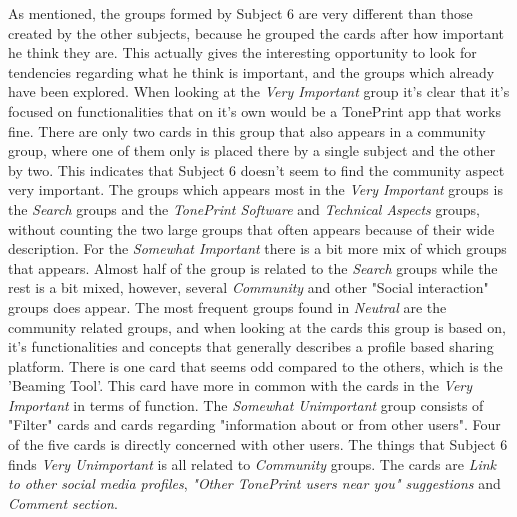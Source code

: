 \noindent
As mentioned, the groups formed by Subject 6 are very different than those created by the other subjects, because he grouped the cards after how important he think they are. This actually gives the interesting opportunity to look for tendencies regarding what he think is important, and the groups which already have been explored. When looking at the \textit{Very Important} group it's clear that it's focused on functionalities that on it's own would be a TonePrint app that works fine. There are only two cards in this group that also appears in a community group, where one of them only is placed there by a single subject and the other by two. This indicates that Subject 6 doesn't seem to find the community aspect very important. The groups which appears most in the \textit{Very Important} groups is the \textit{Search} groups and the \textit{TonePrint Software} and \textit{Technical Aspects} groups, without counting the two large groups that often appears because of their wide description. For the \textit{Somewhat Important} there is a bit more mix of which groups that appears. Almost half of the group is related to the \textit{Search} groups while the rest is a bit mixed, however, several \textit{Community} and other "Social interaction" groups does appear. The most frequent groups found in \textit{Neutral} are the community related groups, and when looking at the cards this group is based on, it's functionalities and concepts that generally describes a profile based sharing platform. There is one card that seems odd compared to the others, which is the 'Beaming Tool'. This card have more in common with the cards in the \textit{Very Important} in terms of function. The \textit{Somewhat Unimportant} group consists of "Filter" cards and cards regarding "information about or from other users". Four of the five cards is directly concerned with other users. The things that Subject 6 finds \textit{Very Unimportant} is all related to \textit{Community} groups. The cards are \textit{Link to other social media profiles}, \textit{"Other TonePrint users near you" suggestions} and \textit{Comment section}.

